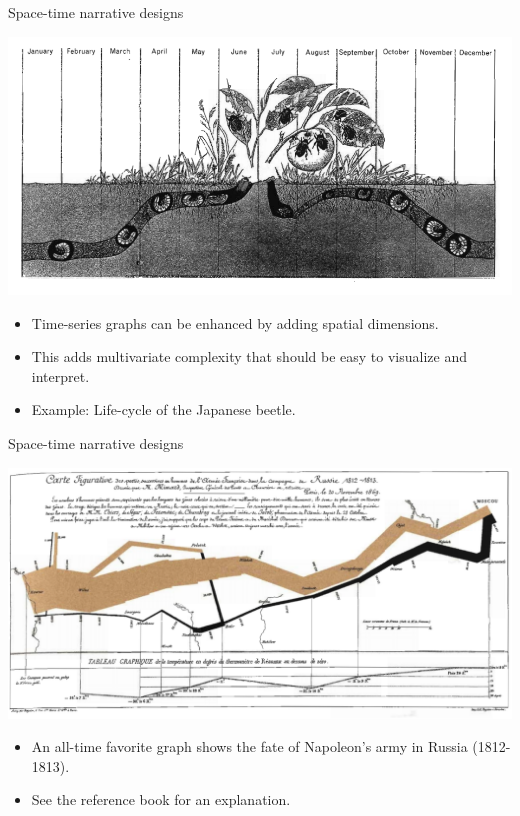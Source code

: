 \documentclass[
  ignorenonframetext,
]{beamer}
\begin{document}
\begin{frame}{Space-time narrative designs}
\label{space-time-narrative-designs}
\begin{minipage}{1\textwidth}
\centering
\includegraphics[width=\textwidth]{excellence_figs/fig_21.png}
\end{minipage}
\hfill
\begin{minipage}{1\textwidth}
\footnotesize
\vspace{3mm}
\begin{itemize}
  \item Time-series graphs can be enhanced by adding spatial dimensions.
  \item This adds multivariate complexity that should be easy to visualize and interpret.
  \item Example: Life-cycle of the Japanese beetle.
\end{itemize}
\end{minipage}
\end{frame}

\begin{frame}{Space-time narrative designs}
\label{space-time-narrative-designs-1}
\begin{minipage}{1\textwidth}
\centering
\includegraphics[width=\textwidth]{excellence_figs/fig_22.png}
\end{minipage}
\hfill
\begin{minipage}{1\textwidth}
\footnotesize
\vspace{3mm}
\begin{itemize}
  \item An all-time favorite graph shows the fate of Napoleon's army in Russia (1812-1813).
  \item See the reference book for an explanation.
\end{itemize}
\end{minipage}
\end{frame}
\end{document}
